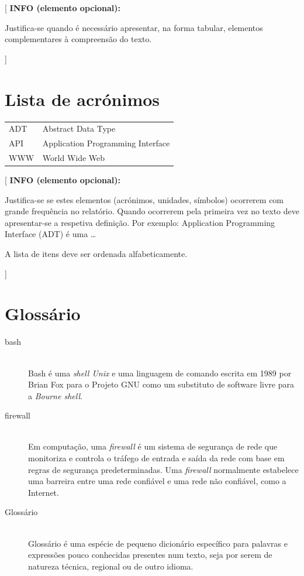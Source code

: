 \documentclass[11pt,a4paper]{report}
\newenvironment{infoopt}[1]{\vspace*{6mm}\color{blue}[ \textbf{INFO (elemento opcional):} \begin{em} #1}
                        {\vspace*{3mm}\end{em} ]}
\begin{document}
\begin{infoopt}
Justifica-se quando é necessário apresentar,  na forma tabular,
elementos complementares à compreensão do texto.
\end{infoopt}


\chapter*{Lista de acrónimos}

\begin{flushleft}
\begin{tabular}{l p{0.8\linewidth}}
ADT      & Abstract Data Type\\
API      & Application Programming Interface\\
WWW      & World Wide Web
\end{tabular}
\end{flushleft}

\begin{infoopt}
Justifica-se se estes elementos (acrónimos, unidades, símbolos)
ocorrerem com grande frequência no relatório.
Quando ocorrerem pela primeira vez no texto deve apresentar-se a
respetiva definição.
Por exemplo: Application Programming Interface (ADT) é uma \ldots 

A lista de itens deve ser ordenada alfabeticamente.
\end{infoopt}


\chapter*{Glossário}

\begin{description}
\item[bash] \hfill \\
  Bash é uma \emph{shell Unix} e uma linguagem de comando escrita 
  em 1989 por Brian Fox para o Projeto GNU como um substituto de 
  software livre para a \emph{Bourne shell}.
\item[firewall] \hfill \\
  Em computação, uma \emph{firewall} é um sistema de segurança de rede 
  que monitoriza e controla o tráfego de entrada e saída da rede 
  com base em regras de segurança predeterminadas.
  Uma \emph{firewall} normalmente estabelece uma barreira entre uma 
  rede confiável e uma rede não confiável, como a Internet.
\item[Glossário] \hfill \\
  Glossário é uma espécie de pequeno dicionário específico para
  palavras e expressões pouco conhecidas presentes num texto, seja
  por serem de natureza técnica, regional ou de outro idioma.
\end{description}
\end{document}
